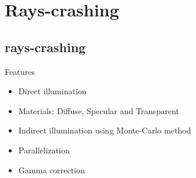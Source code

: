 \documentclass[compress]{beamer}
\begin{document}
\section{Rays-crashing}

\subsection{rays-crashing}
\begin{frame}{Features}
	\begin{itemize}
  \item Direct illumination
  \item Materials: Diffuse, Specular and Transparent
  \item Indirect illumination using Monte-Carlo method
  \item Parallelization
  \item Gamma correction
\end{itemize}
\end{frame}
\end{document}

